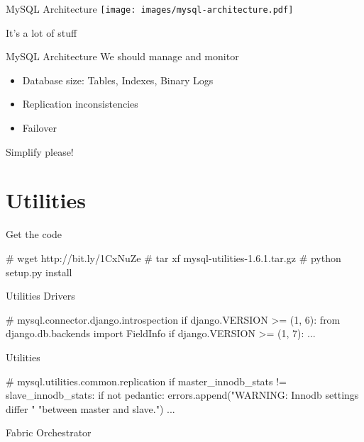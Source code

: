 \documentclass{beamer}[10]
\begin{document}
\begin{pyframe}{MySQL Architecture}
\texttt{[image: images/mysql-architecture.pdf]}
{\large
    \begin{center}
    It's a lot of stuff
    \end{center}
}
\end{pyframe}


\begin{pyframe}{MySQL Architecture}
We should manage and monitor
    \begin{itemize}
    \item Database size: Tables, Indexes, Binary Logs
    \item Replication inconsistencies
    \item Failover
    \end{itemize}
Simplify please!
\end{pyframe}



\section{Utilities}
\begin{pyframe}{Get the code}
    \begin{bashcode}
    # wget http://bit.ly/1CxNuZe
    # tar xf mysql-utilities-1.6.1.tar.gz
    # python setup.py install
    \end{bashcode}

\end{pyframe}


\begin{pyframe}{Utilities}
Drivers
\begin{pycode}
    # mysql.connector.django.introspection
    if django.VERSION >= (1, 6):
        from django.db.backends import FieldInfo
        if django.VERSION >= (1, 7):
            ...
\end{pycode}
Utilities
\begin{pycode}
    # mysql.utilities.common.replication
    if master_innodb_stats != slave_innodb_stats:
        if not pedantic:
            errors.append("WARNING: Innodb settings differ "
                          "between master and slave.")
    ...
\end{pycode}
Fabric Orchestrator
\end{pyframe}
\end{document}
